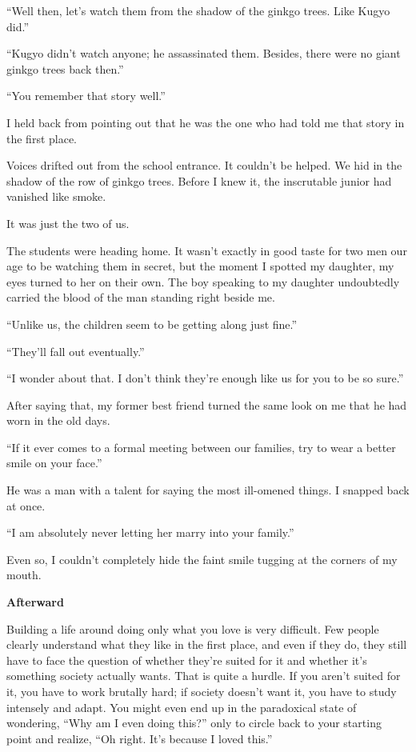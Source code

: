 \documentclass[
    a4paper,
    12pt,
    twoside,
    openany,
    UTF8,
    fontset=windows
]{ctexbook}
\begin{document}
``Well then, let's watch them from the shadow of the ginkgo trees. Like Kugyo did.''

``Kugyo didn't watch anyone; he assassinated them. Besides, there were no giant ginkgo trees back then.''

``You remember that story well.''

I held back from pointing out that he was the one who had told me that story in the first place.

Voices drifted out from the school entrance. It couldn't be helped. We hid in the shadow of the row of ginkgo trees. Before I knew it, the inscrutable junior had vanished like smoke.

It was just the two of us.

The students were heading home. It wasn't exactly in good taste for two men our age to be watching them in secret, but the moment I spotted my daughter, my eyes turned to her on their own. The boy speaking to my daughter undoubtedly carried the blood of the man standing right beside me.

``Unlike us, the children seem to be getting along just fine.''

``They'll fall out eventually.''

``I wonder about that. I don't think they're enough like us for you to be so sure.''

After saying that, my former best friend turned the same look on me that he had worn in the old days.

``If it ever comes to a formal meeting between our families, try to wear a better smile on your face.''

He was a man with a talent for saying the most ill-omened things. I snapped back at once.

``I am absolutely never letting her marry into your family.''

Even so, I couldn't completely hide the faint smile tugging at the corners of my mouth.

\clearpage
\thispagestyle{plain}
\begin{center}
    \large\bfseries
    Afterward
\end{center}
\label{sec:afterwordV3}
\vspace{1cm}

Building a life around doing only what you love is very difficult. Few people clearly understand what they like in the first place, and even if they do, they still have to face the question of whether they're suited for it and whether it's something society actually wants. That is quite a hurdle. If you aren't suited for it, you have to work brutally hard; if society doesn't want it, you have to study intensely and adapt. You might even end up in the paradoxical state of wondering, ``Why am I even doing this?'' only to circle back to your starting point and realize, ``Oh right. It's because I loved this.''
\end{document}
